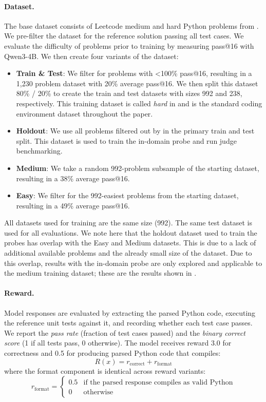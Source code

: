 \documentclass{article}
\begin{document}
\paragraph{Dataset.} The base dataset consists of Leetcode medium and hard Python problems from \cite{leetcodedataset}. We pre-filter the dataset for the reference solution passing all test cases. We evaluate the difficulty of problems prior to training by measuring pass@16 with Qwen3-4B. We then create four variants of the dataset:
\begin{itemize}
    \item \textbf{Train \& Test}: We filter for problems with <100\% pass@16, resulting in a 1,230 problem dataset with 20\% average pass@16. We then split this dataset 80\% / 20\% to create the train and test datasets with sizes 992 and 238, respectively. This training dataset is called \emph{hard} in  and is the standard coding environment dataset throughout the paper.
    \item \textbf{Holdout}: We use all problems filtered out by in the primary train and test split. This dataset is used to train the in-domain probe and run judge benchmarking.
    \item \textbf{Medium}: We take a random 992-problem subsample of the starting dataset, resulting in a 38\% average pass@16. 
    \item \textbf{Easy}: We filter for the 992-easiest problems from the starting dataset, resulting in a 49\% average pass@16. 
\end{itemize}

All datasets used for training are the same size (992). The same test dataset is used for all evaluations. We note here that the holdout dataset used to train the probes has overlap with the Easy and Medium datasets. This is due to a lack of additional available problems and the already small size of the dataset. Due to this overlap, results with the in-domain probe are only explored and applicable to the medium training dataset; these are the results shown in .

\paragraph{Reward.} Model responses are evaluated by extracting the parsed Python code, executing the reference unit tests against it, and recording whether each test case passes. We report the \emph{pass rate} (fraction of test cases passed) and the \emph{binary correct score} (1 if all tests pass, 0 otherwise). The model receives reward 3.0 for correctness and 0.5 for producing parsed Python code that compiles:
\[
R(x) = r_{\text{correct}} + r_{\text{format}}
\]
where the format component is identical across reward variants:
\[
r_{\text{format}} = \begin{cases}
0.5 & \text{if the parsed response compiles as valid Python} \\
0 & \text{otherwise}
\end{cases}
\]
\end{document}
